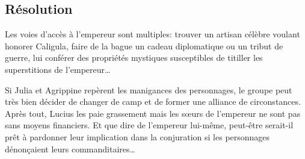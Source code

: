 \subsection{Résolution}

Les voies d'accès à l'empereur sont multiples: trouver un artisan célèbre voulant honorer Caligula, faire de la bague un cadeau diplomatique ou un tribut de guerre, lui conférer des propriétés mystiques susceptibles de titiller les superstitions de l'empereur\dots

Si Julia et Agrippine repèrent les manigances des personnages, le groupe peut très bien décider de changer de camp et de former une alliance de circonstances.
Après tout, Lucius les paie grassement mais les sœurs de l'empereur ne sont pas sans moyens financiers.
Et que dire de l'empereur lui-même, peut-être serait-il prêt à pardonner leur implication dans la conjuration si les personnages dénonçaient leurs commanditaires\dots

